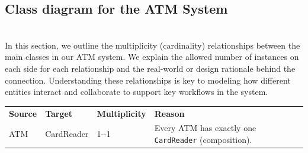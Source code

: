 \subsection{Class diagram for the ATM System}\label{co8y4vDhgPnVfFgbUrLxO}
\\
In this section, we outline the multiplicity (cardinality) relationships between the main classes in our ATM system. We explain the allowed number of instances on each side for each relationship and the real-world or design rationale behind the connection. Understanding these relationships is key to modeling how different entities interact and collaborate to support key workflows in the system.

\begin{center}
{\def\LTcaptype{none} %
\begin{longtable}[]{@{}
>{\raggedright\arraybackslash} p{}
>{\raggedright\arraybackslash} p{}
>{\raggedright\arraybackslash} p{}
>{\raggedright\arraybackslash} p{}@{}}
\toprule\noalign{}
\endhead
\bottomrule\noalign{}
\endlastfoot
\begin{minipage}[t]{\linewidth}\raggedright
\textbf{Source}
\end{minipage} & \begin{minipage}[t]{\linewidth}\raggedright
\textbf{Target}
\end{minipage} & \begin{minipage}[t]{\linewidth}\raggedright
\textbf{Multiplicity}
\end{minipage} & \begin{minipage}[t]{\linewidth}\raggedright
\textbf{Reason}
\end{minipage} \\
\begin{minipage}[t]{\linewidth}\raggedright
ATM
\end{minipage} & \begin{minipage}[t]{\linewidth}\raggedright
CardReader
\end{minipage} & \begin{minipage}[t]{\linewidth}\raggedright
1-\/-1
\end{minipage} & \begin{minipage}[t]{\linewidth}\raggedright
Every ATM has exactly one \texttt{CardReader} (composition).
\end{minipage} \\

\end{longtable}}
\end{center}
